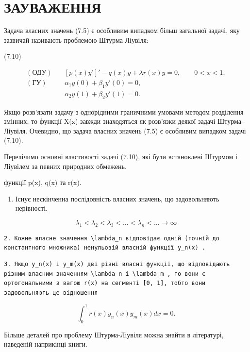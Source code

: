 \documentclass[
  ukrainian,
]{article}
\providecommand{\tightlist}{%
  \setlength{\itemsep}{0pt}\setlength{\parskip}{0pt}}
\begin{document}
\section{ЗАУВАЖЕННЯ}\label{ux437ux430ux443ux432ux430ux436ux435ux43dux43dux44f-5}

Задача власних значень (7.5) є особливим випадком більш загальної
задачі, яку зазвичай називають проблемою Штурма-Ліувіля:

(7.10)

\[
\begin{aligned}
(\text{ОДУ})\quad & [p(x)y']' - q(x)y + \lambda r(x)y = 0,\qquad 0<x<1,\\
(\text{ГУ})\quad & \alpha_1 y(0) + \beta_1 y'(0)=0,\\
& \alpha_2 y(1) + \beta_2 y'(1)=0.
\end{aligned}
\]

Якщо розв'язати задачу з однорідними граничними умовами методом
розділення змінних, то функції X(x) завжди знаходяться як розв'язки
деякої задачі Штурма--Ліувіля. Очевидно, що задача власних значень (7.5)
є особливим випадком задачі (7.10).

Перелічимо основні властивості задачі (7.10), які були встановлені
Штурмом і Ліувілем за певних природних обмежень.

функції p(x), q(x) та r(x).

\begin{enumerate}
\def\labelenumi{\arabic{enumi}.}
\tightlist
\item
  Існує нескінченна послідовність власних значень, що задовольняють
  нерівності.
\end{enumerate}

\[
\lambda_1 < \lambda_2 < \lambda_3 < \ldots < \lambda_n < \ldots \to \infty
\]

\begin{verbatim}
2. Кожне власне значення \lambda_n відповідає одній (точній до константного множника) ненульовій власній функції y_n(x) .
\end{verbatim}

\begin{verbatim}
3. Якщо y_n(x) і y_m(x) дві різні власні функції, що відповідають різним власним значенням \lambda_n і \lambda_m , то вони є ортогональними з вагою r(x) на сегменті [0, 1], тобто вони задовольняють це відношення
\end{verbatim}

\[
\int_{0}^{1} r(x) y_{n}(x) y_{m}(x) dx = 0.
\]

Більше деталей про проблему Штурма-Ліувіля можна знайти в літературі,
наведеній наприкінці книги.
\end{document}
